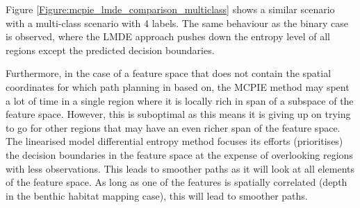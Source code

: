 			Figure \ref{Figure:mcpie_lmde_comparison_multiclass} shows a similar scenario with a multi-class scenario with 4 labels. The same behaviour as the binary case is observed, where the LMDE approach pushes down the entropy level of all regions except the predicted decision boundaries.

			Furthermore, in the case of a feature space that does not contain the spatial coordinates for which path planning in based on, the MCPIE method may spent a lot of time in a single region where it is locally rich in span of a subspace of the feature space. However, this is suboptimal as this means it is giving up on trying to go for other regions that may have an even richer span of the feature space. The linearised model differential entropy method focuses its efforts (prioritises) the decision boundaries in the feature space at the expense of overlooking regions with less observations. This leads to smoother paths as it will look at all elements of the feature space. As long as one of the features is spatially correlated (depth in the benthic habitat mapping case), this will lead to smoother paths.
	
	







